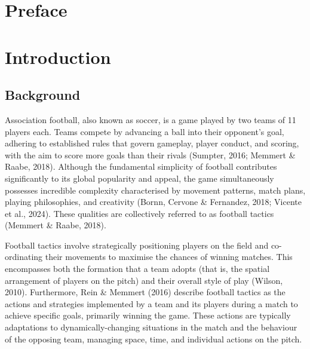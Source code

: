 \documentclass[
  a4paper,
  twoside]{uoe-thesis-template}
\begin{document}
\chapter*{Preface}\label{preface}



\chapter{Introduction}\label{introduction}

\section{Background}\label{background}

Association football, also known as soccer, is a game played by two
teams of 11 players each. Teams compete by advancing a ball into their
opponent's goal, adhering to established rules that govern gameplay,
player conduct, and scoring, with the aim to score more goals than their
rivals (Sumpter, 2016; Memmert \& Raabe, 2018). Although the fundamental
simplicity of football contributes significantly to its global
popularity and appeal, the game simultaneously possesses incredible
complexity characterised by movement patterns, match plans, playing
philosophies, and creativity (Bornn, Cervone \& Fernandez, 2018; Vicente
et al., 2024). These qualities are collectively referred to as football
tactics (Memmert \& Raabe, 2018).

Football tactics involve strategically positioning players on the field
and co-ordinating their movements to maximise the chances of winning
matches. This encompasses both the formation that a team adopts (that
is, the spatial arrangement of players on the pitch) and their overall
style of play (Wilson, 2010). Furthermore, Rein \& Memmert (2016)
describe football tactics as the actions and strategies implemented by a
team and its players during a match to achieve specific goals, primarily
winning the game. These actions are typically adaptations to
dynamically-changing situations in the match and the behaviour of the
opposing team, managing space, time, and individual actions on the
pitch.
\end{document}
